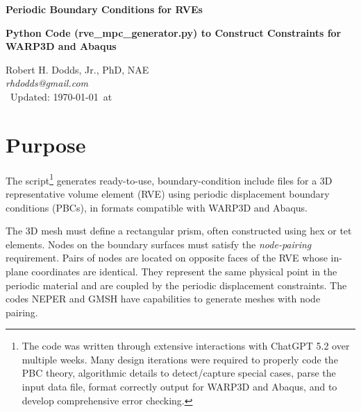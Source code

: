 \documentclass[11pt]{article}
\newcommand{\ti}{\emph}
\begin{document}
\LARGE
\noindent \textbf{Periodic Boundary Conditions for RVEs}


\small
\noindent \textbf{Python Code (rve\_mpc\_generator.py) to Construct Constraints
 for WARP3D and Abaqus}\\

\vspace{0.2 in}
\noindent Robert H. Dodds, Jr., PhD, NAE\\
\small
\noindent \rm{\it{rhdodds@gmail.com}}\\
{\small{\  Updated:  \today\ at \currenttime}}

\vspace{0.2 in}

\section{Purpose}
\label{app:pbc_script_logic}

The script\footnote{The code was written through extensive
interactions with ChatGPT 5.2 over multiple weeks. 
Many design iterations were required to
properly code the PBC theory, algorithmic details to detect/capture
special cases, parse the input data file, format correctly output for
WARP3D and Abaqus, and to
develop comprehensive error checking. } generates ready-to-use, boundary-condition 
include files for a 3D representative volume element (RVE) using periodic 
displacement boundary conditions (PBCs), in formats compatible with WARP3D and Abaqus.

The 3D mesh must define a rectangular prism, often constructed 
using hex or tet elements. Nodes on the boundary surfaces
must satisfy the \ti{node-pairing} requirement. Pairs 
of nodes are located on opposite faces of the RVE whose
in-plane coordinates are identical. They represent the same physical point in the periodic 
material and are coupled by the periodic displacement constraints. The codes NEPER and
GMSH have capabilities to generate meshes with node pairing.
\end{document}
